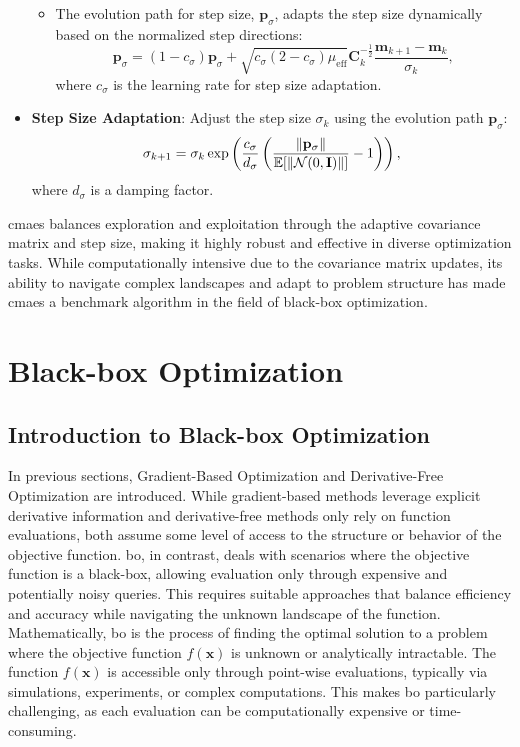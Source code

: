 \begin{itemize}
\begin{itemize}
        \item The evolution path for step size, \(\mathbf{p}_\sigma\), adapts the step size dynamically based on the normalized step directions:
        \begin{equation}
        \mathbf{p}_\sigma = (1 - c_\sigma) \mathbf{p}_\sigma + \sqrt{c_\sigma (2 - c_\sigma) \mu_\text{eff}} \mathbf{C}_k^{-\frac{1}{2}} \frac{\mathbf{m}_{k+1} - \mathbf{m}_k}{\sigma_k},
        \end{equation}
        where \(c_\sigma\) is the learning rate for step size adaptation.
    \end{itemize}
    
    \item \textbf{Step Size Adaptation}: Adjust the step size \(\sigma_k\) using the evolution path \(\mathbf{p}_\sigma\):
    \begin{equation}
    \sigma_{k+1} = \sigma_k \exp\left(\frac{c_\sigma}{d_\sigma} \left(\frac{\norm{\mathbf{p}_\sigma}}{\mathbb{E}[\norm{\mathcal{N}(0, \mathbf{I})}]} - 1\right)\right),
    \end{equation}
    where \(d_\sigma\) is a damping factor.
\end{itemize}

\ac{cmaes} balances exploration and exploitation through the adaptive covariance matrix and step size, making it highly robust and effective in diverse optimization tasks. While computationally intensive due to the covariance matrix updates, its ability to navigate complex landscapes and adapt to problem structure has made \ac{cmaes} a benchmark algorithm in the field of black-box optimization.


\section{Black-box Optimization}
\label{section:black_box_optimization}
\subsection{Introduction to Black-box Optimization}
In previous sections, Gradient-Based Optimization and Derivative-Free Optimization are introduced. While gradient-based methods leverage explicit derivative information and derivative-free methods only rely on function evaluations, both assume some level of access to the structure or behavior of the objective function. \acf{bo}, in contrast, deals with scenarios where the objective function is a black-box, allowing evaluation only through expensive and potentially noisy queries. This requires suitable approaches that balance efficiency and accuracy while navigating the unknown landscape of the function.  Mathematically, \ac{bo} is the process of finding the optimal solution to a problem where the objective function  $f(\mathbf{x})$ is unknown or analytically intractable. The function $f(\mathbf{x})$ is accessible only through point-wise evaluations, typically via simulations, experiments, or complex computations. This makes \ac{bo} particularly challenging, as each evaluation can be computationally expensive or time-consuming.  

